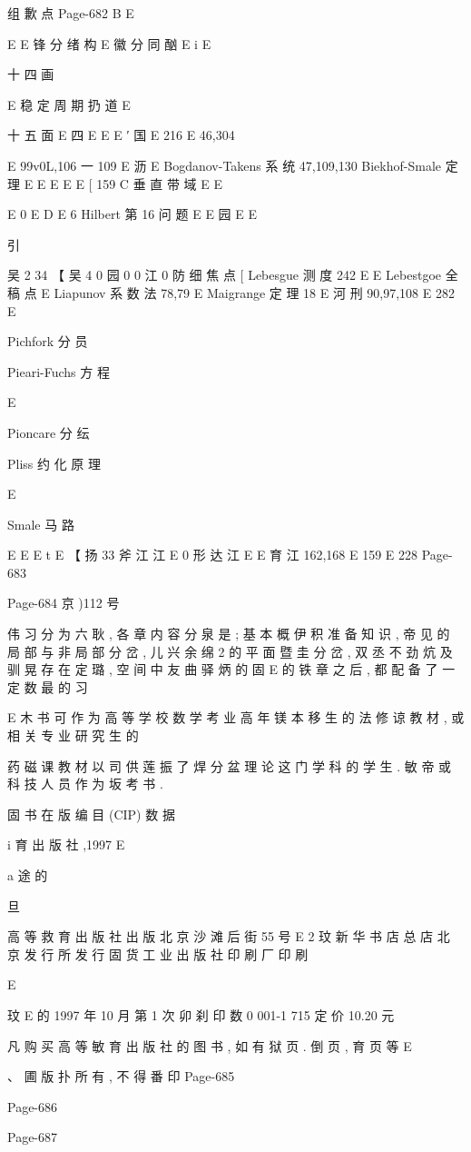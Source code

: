 组 歉 点
Page-682
B E

E E
锋 分 绪 构 E
徽 分 同 酗 E
i E

十 四 画

E
稳 定 周 期 扔 道
E

十 五 面
E 四
E E
E ′ 国
E 216
E 46,304

E 99v0L,106 一 109
E 沥 E
Bogdanov-Takens 系 统 47,109,130
Biekhof-Smale 定 理 E
E E
E E
[ 159
C 垂 直 带 域 E
E

E 0
E D
E 6
Hilbert 第 16 问 题 E
E 园
E E

引

吴 2 34
【 吴 4
0 园
0 0
江 0
防 细 焦 点 [
Lebesgue 测 度 242
E E
Lebestgoe 全 稿 点 E
Liapunov 系 数 法 78,79
E
Maigrange 定 理 18
E 河 刑 90,97,108
E 282
E

Pichfork 分 员

Pieari-Fuchs 方 程

E

Pioncare 分 纭

Pliss 约 化 原 理

E

Smale 马 路

E E
E t E
【 扬 33 斧 江 江 E
0 形 达 江 E
E 育 江 162,168
E 159
E 228
Page-683

Page-684
京 )112 号

伟 习 分 为 六 耿 , 各 章 内 容 分 泉 是 ; 基 本 概 伊 积 准 备 知 识 , 帝 见 的 局 部 与 非 局 部 分
岔 , 儿 兴 余 绵 2 的 平 面 暨 圭 分 岔 , 双 丞 不 劲 炕 及 驯 晃 存 在 定 璐 , 空 间 中 友 曲 驿 炳 的 固
E 的 铁 章 之 后 , 都 配 备 了 一 定 数 最 的 习

E
木 书 可 作 为 高 等 学 校 数 学 考 业 高 年 镁 本 移 生 的 法 修 谅 教 材 , 或 相 关 专 业 研 究 生 的

药 磁 课 教 材 以 司 供 莲 振 了 焊 分 盆 理 论 这 门 学 科 的 学 生 . 敏 帝 或 科 技 人 员 作 为 坂 考 书 .

固 书 在 版 编 目 (CIP) 数 据

i
育 出 版 社 ,1997
E

a 途 的

旦

高 等 救 育 出 版 社 出 版
北 京 沙 滩 后 街 55 号
E 2 玟
新 华 书 店 总 店 北 京 发 行 所 发 行
固 货 工 业 出 版 社 印 刷 厂 印 刷

E

玟
E 的 1997 年 10 月 第 1 次 卯 刹
印 数 0 001-1 715
定 价 10.20 元

凡 购 买 高 等 敏 育 出 版 社 的 图 书 , 如 有 狱 页 . 倒 页 , 育 页 等
E

、 圃 版 扑 所 有 , 不 得 番 印
Page-685

Page-686

Page-687
